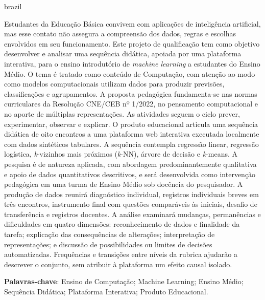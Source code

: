 \setlength{\absparsep}{18pt} 

\begin{resumo}[Resumo]
 \begin{otherlanguage*}{brazil}
   
   \vspace{\onelineskip}
   \noindent 
   
Estudantes da Educação Básica convivem com aplicações de inteligência artificial, mas esse contato não assegura a compreensão dos dados, regras e escolhas envolvidos em seu funcionamento. Este projeto de qualificação tem como objetivo desenvolver e analisar uma sequência didática, apoiada por uma plataforma interativa, para o ensino introdutório de \textit{machine learning} a estudantes do Ensino Médio. O tema é tratado como conteúdo de Computação, com atenção ao modo como modelos computacionais utilizam dados para produzir previsões, classificações e agrupamentos. A proposta pedagógica fundamenta-se nas normas curriculares da Resolução CNE/CEB nº 1/2022, no pensamento computacional e no aporte de múltiplas representações. As atividades seguem o ciclo prever, experimentar, observar e explicar. O produto educacional articula uma sequência didática de oito encontros a uma plataforma web interativa executada localmente com dados sintéticos tabulares. A sequência contempla regressão linear, regressão logística, \textit{k}-vizinhos mais próximos (\textit{k}-NN), árvore de decisão e \textit{k}-means. A pesquisa é de natureza aplicada, com abordagem predominantemente qualitativa e apoio de dados quantitativos descritivos, e será desenvolvida como intervenção pedagógica em uma turma de Ensino Médio sob docência do pesquisador. A produção de dados reunirá diagnóstico individual, registros individuais breves em três encontros, instrumento final com questões comparáveis às iniciais, desafio de transferência e registros docentes. A análise examinará mudanças, permanências e dificuldades em quatro dimensões: reconhecimento de dados e finalidade da tarefa; explicação das consequências de alterações; interpretação de representações; e discussão de possibilidades ou limites de decisões automatizadas. Frequências e transições entre níveis da rubrica ajudarão a descrever o conjunto, sem atribuir à plataforma um efeito causal isolado.
   
   \textbf{Palavras-chave}: Ensino de Computação; Machine Learning; Ensino Médio; Sequência Didática; Plataforma Interativa; Produto Educacional.

 \end{otherlanguage*}
\end{resumo}


